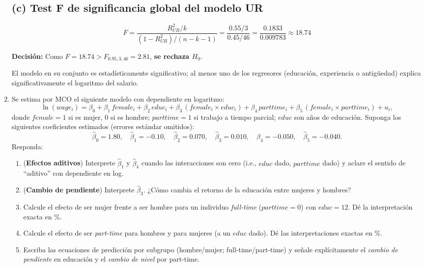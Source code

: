 \documentclass[10pt,a4paper]{article}
\begin{document}
\begin{enumerate}
\subsection*{(c) Test F de significancia global del modelo UR}

\[
F = \frac{R^2_{UR}/k}{(1-R^2_{UR})/(n-k-1)} = \frac{0.55/3}{0.45/46} = \frac{0.1833}{0.009783} \approx 18.74
\]

\textbf{Decisión:} Como \(F = 18.74 > F_{0.95,3,46} = 2.81\), \textbf{se rechaza \(H_0\)}.

\begin{conclusion}
El modelo en su conjunto es estadísticamente significativo; al menos uno de los regresores (educación, experiencia o antigüedad) explica significativamente el logaritmo del salario.
\end{conclusion}



\item Se estima por MCO el siguiente modelo con dependiente en logaritmo:
\[
\ln(wage_i)=\beta_0+\beta_1\,female_i+\beta_2\,educ_i+\beta_3\,(female_i\times educ_i)
+\beta_4\,parttime_i+\beta_5\,(female_i\times parttime_i)+u_i,
\]
donde $female=1$ si es mujer, $0$ si es hombre; $parttime=1$ si trabajo a tiempo parcial; $educ$ son años de educación. Suponga los siguientes coeficientes estimados (errores estándar omitidos):
\[
\widehat{\beta}_0=1.80,\quad \widehat{\beta}_1=-0.10,\quad \widehat{\beta}_2=0.070,\quad 
\widehat{\beta}_3=0.010,\quad \widehat{\beta}_4=-0.050,\quad \widehat{\beta}_5=-0.040.
\]
Responda:
\begin{enumerate}
  \item (\textbf{Efectos aditivos}) Interprete $\widehat{\beta}_1$ y $\widehat{\beta}_4$ cuando las interacciones son cero (i.e., $educ$ dado, $parttime$ dado) y aclare el sentido de ``aditivo'' con dependiente en log.
  \item (\textbf{Cambio de pendiente}) Interprete $\widehat{\beta}_3$. ¿Cómo cambia el retorno de la educación entre mujeres y hombres?
  \item Calcule el efecto de ser mujer frente a ser hombre para un individuo \emph{full-time} ($parttime=0$) con $educ=12$. Dé la interpretación exacta en \%.
  \item Calcule el efecto de ser \emph{part-time} para hombres y para mujeres (a un $educ$ dado). Dé las interpretaciones exactas en \%.
  \item Escriba las ecuaciones de predicción por subgrupo (hombre/mujer; full-time/part-time) y señale explícitamente el \emph{cambio de pendiente} en educación y el \emph{cambio de nivel} por part-time.
\end{enumerate}


\end{enumerate}
\end{document}

